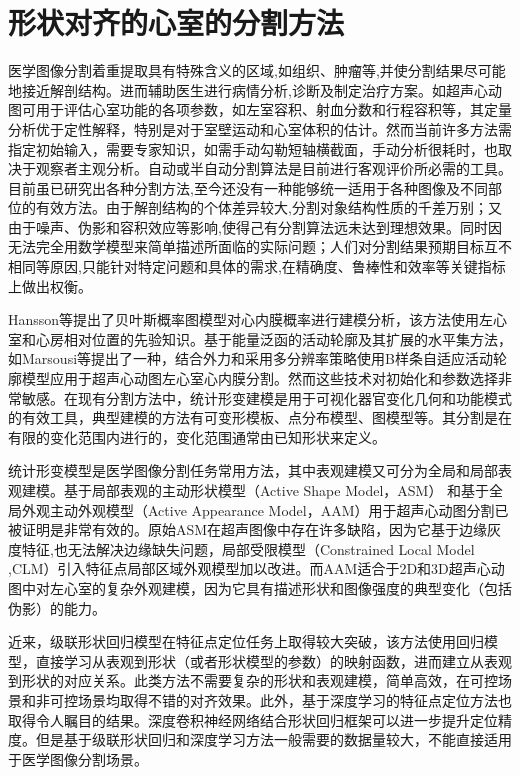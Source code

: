 \chapter{形状对齐的心室的分割方法}
\label{chap:Segmentation}
 
医学图像分割着重提取具有特殊含义的区域,如组织、肿瘤等,并使分割结果尽可能地接近解剖结构。进而辅助医生进行病情分析,诊断及制定治疗方案。如超声心动图可用于评估心室功能的各项参数，如左室容积、射血分数和行程容积等，其定量分析优于定性解释，特别是对于室壁运动和心室体积的估计。然而当前许多方法需指定初始输入，需要专家知识，如需手动勾勒短轴横截面，手动分析很耗时，也取决于观察者主观分析。自动或半自动分割算法是目前进行客观评价所必需的工具。目前虽已研究出各种分割方法,至今还没有一种能够统一适用于各种图像及不同部位的有效方法。由于解剖结构的个体差异较大,分割对象结构性质的千差万别；又由于噪声、伪影和容积效应等影响,使得己有分割算法远未达到理想效果。同时因无法完全用数学模型来简单描述所面临的实际问题；人们对分割结果预期目标互不相同等原因,只能针对特定问题和具体的需求,在精确度、鲁棒性和效率等关键指标上做出权衡\citep{Bosch2002}。

Hansson等\citep{Hansson2014}提出了贝叶斯概率图模型对心内膜概率进行建模分析，该方法使用左心室和心房相对位置的先验知识。基于能量泛函的活动轮廓及其扩展的水平集方法，如Marsousi等\citep{Marsousi2010}提出了一种，结合外力和采用多分辨率策略使用B样条自适应活动轮廓模型应用于超声心动图左心室心内膜分割。然而这些技术对初始化和参数选择非常敏感。在现有分割方法中，统计形变建模是用于可视化器官变化几何和功能模式的有效工具\citep{Santiago2016}，典型建模的方法有可变形模板、点分布模型、图模型等。其分割是在有限的变化范围内进行的，变化范围通常由已知形状来定义。

统计形变模型是医学图像分割任务常用方法，其中表观建模又可分为全局和局部表观建模。基于局部表观的主动形状模型（Active Shape Model，ASM）\citep{Cootes1995a} 和基于全局外观主动外观模型（Active Appearance Model，AAM）\citep{Cootes2001}用于超声心动图分割已被证明是非常有效的\citep{Bosch2002,Mitchell2002,Vargas-Quintero2016}。原始ASM在超声图像中存在许多缺陷\citep{Santiago2016}，因为它基于边缘灰度特征,也无法解决边缘缺失问题，局部受限模型\citep{Cristinacce2008a}（Constrained Local Model ,CLM）引入特征点局部区域外观模型加以改进。而AAM适合于2D和3D超声心动图中对左心室的复杂外观建模，因为它具有描述形状和图像强度的典型变化（包括伪影）的能力\citep{VanStralen2015}。

近来，级联形状回归模型\citep{Kazemi2014a}在特征点定位任务上取得较大突破，该方法使用回归模型，直接学习从表观到形状（或者形状模型的参数）的映射函数，进而建立从表观到形状的对应关系。此类方法不需要复杂的形状和表观建模，简单高效，在可控场景和非可控场景均取得不错的对齐效果。此外，基于深度学习的特征点定位方法\citep{Trigeorgis2016}也取得令人瞩目的结果。深度卷积神经网络结合形状回归框架可以进一步提升定位精度。但是基于级联形状回归和深度学习方法一般需要的数据量较大，不能直接适用于医学图像分割场景。

